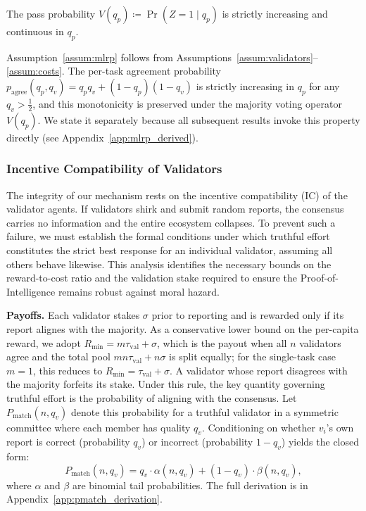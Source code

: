 \begin{assumption}
\label{assum:mlrp}
The pass probability $V(q_p) \coloneqq \Pr(Z = 1 \mid q_p)$ is strictly increasing and continuous in $q_p$.
\end{assumption}

\begin{remark}
\label{rem:mlrp_derived}
Assumption~\ref{assum:mlrp} follows from Assumptions~\ref{assum:validators}--\ref{assum:costs}. The per-task agreement probability $p_{\text{agree}}(q_p, q_v) = q_p q_v + (1 - q_p)(1 - q_v)$ is strictly increasing in $q_p$ for any $q_v > \tfrac{1}{2}$, and this monotonicity is preserved under the majority voting operator $V(q_p)$. We state it separately because all subsequent results invoke this property directly (see Appendix~\ref{app:mlrp_derived}).
\end{remark}


\subsubsection{Incentive Compatibility of Validators}
\label{sec:ic}

The integrity of our mechanism rests on the incentive compatibility (IC) of the validator agents. If validators shirk and submit random reports, the consensus carries no information and the entire ecosystem collapses. To prevent such a failure, we must establish the formal conditions under which truthful effort constitutes the strict best response for an individual validator, assuming all others behave likewise. This analysis identifies the necessary bounds on the reward-to-cost ratio and the validation stake required to ensure the Proof-of-Intelligence remains robust against moral hazard.

\noindent\textbf{Payoffs.}
Each validator stakes $\sigma$ prior to reporting and is rewarded only if its report alignes with the majority. As a conservative lower bound on the per-capita reward, we adopt $R_{\min} = m\tau_{\text{val}} + \sigma$, which is the payout when all $n$ validators agree and the total pool $mn\tau_{\text{val}} + n\sigma$ is split equally; for the single-task case $m=1$, this reduces to $R_{\min} = \tau_{\text{val}} + \sigma$. A validator whose report disagrees with the majority forfeits its stake. Under this rule, the key quantity governing truthful effort is the probability of aligning with the consensus. Let $P_{\text{match}}(n, q_v)$ denote this probability for a truthful validator in a symmetric committee where each member has quality $q_v$. Conditioning on whether $v_i$'s own report is correct (probability $q_v$) or incorrect (probability $1-q_v$) yields the closed form:
\begin{equation}
\label{eq:pmatch}
P_{\text{match}}(n, q_v) = q_v \cdot \alpha(n, q_v) + (1 - q_v) \cdot \beta(n, q_v),
\end{equation}
where $\alpha$ and $\beta$ are binomial tail probabilities. The full derivation is in Appendix~\ref{app:pmatch_derivation}.

